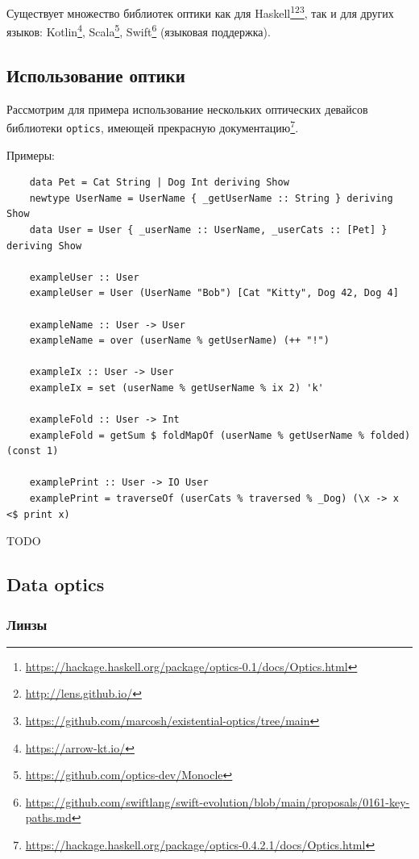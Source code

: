 Существует множество библиотек оптики как для Haskell\footnote{\url{https://hackage.haskell.org/package/optics-0.1/docs/Optics.html}}\footnote{\url{http://lens.github.io/}}\footnote{\url{https://github.com/marcosh/existential-optics/tree/main}}, так и для других языков: Kotlin\footnote{\url{https://arrow-kt.io/}}, Scala\footnote{\url{https://github.com/optics-dev/Monocle}}, Swift\footnote{\url{https://github.com/swiftlang/swift-evolution/blob/main/proposals/0161-key-paths.md}} (языковая поддержка).

\subsection{Использование оптики}

Рассмотрим для примера использование нескольких оптических девайсов библиотеки \texttt{optics}, имеющей прекрасную документацию\footnote{\url{https://hackage.haskell.org/package/optics-0.4.2.1/docs/Optics.html}}.


Примеры:
\begin{verbatim}
    data Pet = Cat String | Dog Int deriving Show
    newtype UserName = UserName { _getUserName :: String } deriving Show
    data User = User { _userName :: UserName, _userCats :: [Pet] } deriving Show

    exampleUser :: User
    exampleUser = User (UserName "Bob") [Cat "Kitty", Dog 42, Dog 4]

    exampleName :: User -> User
    exampleName = over (userName % getUserName) (++ "!")

    exampleIx :: User -> User
    exampleIx = set (userName % getUserName % ix 2) 'k'

    exampleFold :: User -> Int
    exampleFold = getSum $ foldMapOf (userName % getUserName % folded) (const 1)

    examplePrint :: User -> IO User
    examplePrint = traverseOf (userCats % traversed % _Dog) (\x -> x <$ print x)
\end{verbatim}

TODO %

\subsection{Data optics}

\subsubsection{Линзы}

